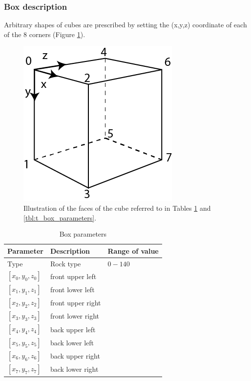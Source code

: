 \subsubsection{Box description}
Arbitrary shapes of cubes are prescribed by setting the (x,y,z) coordinate of each of the 8 corners (Figure \ref{fig:cube}).

\begin{figure}
	\centering
	\includegraphics{Illustrations/i3elviscube.png}
	\caption{Illustration of the faces of the cube referred to in Tables \ref{tbl:box_parameters} and \ref{tbl:t_box_parameters}.}
	\label{fig:cube}
\end{figure}

\begin{table}[H]
	\centering
	\begin{tabular}{l l l}
		\toprule
		Parameter		& Description			& Range of value \\
		\midrule
		Type			& Rock type				& $0-140$\\
		$[x_0,y_0,z_0]$ & front upper left\\ 
		$[x_1,y_1,z_1]$ & front lower left \\  
		$[x_2,y_2,z_2]$ & front upper right \\ 
		$[x_3,y_3,z_3]$ & front lower right \\ 
		$[x_4,y_4,z_4]$ & back upper left \\  
		$[x_5,y_5,z_5]$ & back lower left \\ 
		$[x_6,y_6,z_6]$ & back upper right \\  
		$[x_7,y_7,z_7]$ & back lower right \\ 
		\bottomrule
	\end{tabular}
	\caption{Box parameters}
	\label{tbl:box_parameters}
\end{table}

